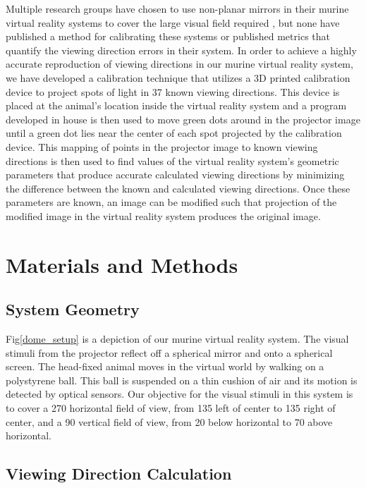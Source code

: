 \documentclass[10pt,letterpaper]{article}
\begin{document}
Multiple research groups have chosen to use non-planar mirrors in their murine
virtual reality systems to cover the large visual field required
\cite{holscher2005rats, harvey2009intracellular}, but none have published a
method for calibrating these systems or published metrics that quantify the
viewing direction errors in their system. In order to achieve a highly accurate
reproduction of viewing directions in our murine virtual reality system, we
have developed a calibration technique that utilizes a 3D printed calibration
device to project spots of light in 37 known viewing directions. This device is
placed at the animal's location inside the virtual reality system and a program
developed in house is then used to move green dots around in the projector
image until a green dot lies near the center of each spot projected by the
calibration device. This mapping of points in the projector image to known
viewing directions is then used to find values of the virtual reality system's
geometric parameters that produce accurate calculated viewing directions by
minimizing the difference between the known and calculated viewing directions.
Once these parameters are known, an image can be modified such that 
projection of the modified image in the virtual reality system produces the
original image.

\section*{Materials and Methods}

\subsection*{System Geometry}

Fig\ref{dome_setup} is a depiction of our murine virtual reality
system. The visual stimuli from the projector reflect off a spherical mirror
and onto a spherical screen. The head-fixed animal moves in the virtual world
by walking on a polystyrene ball. This ball is suspended on a thin cushion of
air and its motion is detected by optical sensors. Our objective for the
visual stimuli in this system is to cover a 270\textdegree{} horizontal field of
view, from 135\textdegree{} left of center to 135\textdegree{} right of center,
and a 90\textdegree{} vertical field of view, from 20\textdegree{} below
horizontal to 70\textdegree{} above horizontal.


\subsection*{Viewing Direction Calculation}
\end{document}
